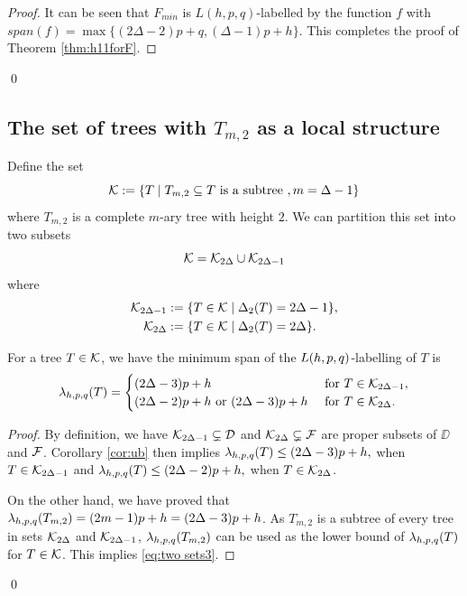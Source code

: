 \begin{proof}
It can be seen that $F_{min}$ is $L(h,p,q)$-labelled by the function $f$ with $span(f) = \max\{(2\Delta - 2)p+q, (\Delta-1)p+h\}$. This completes the proof of Theorem \ref{thm:h11forF}. 
\end{proof}
\qed






\subsection{The set of trees with $T_{m,2}$ as a local structure}
\label{subsection:tm2}

Define the set 
\[
{\cal K} :=\{ T \mid T_{m,2} \subseteq T \text{ is a subtree }, m = \Delta-1\}
\]
where $T_{m,2}$ is a complete $m$-ary tree with height $2$. We can partition this set into two subsets
\[
{\cal K} = {\cal K}_{2\Delta} \cup {\cal K}_{2\Delta-1}
\]
where
\begin{align*}
{\cal K}_{2\Delta-1} &:= \{ T \in {\cal K} \mid \Delta_2(T) = 2\Delta-1\}, \\
{\cal K}_{2\Delta} &:= \{T \in {\cal K} \mid \Delta_2(T) = 2\Delta\}. 
\end{align*}

\begin{corollary} 
For a tree $T \in {\cal K}$, we have the minimum span of the $L(h,p,q)$-labelling of $T$ is
\begin{align}
\label{eq:two sets3}
\lambda_{h,p,q}(T) = 
 \begin{cases}
 (2\Delta-3)p+h & \text{ for } T \in {\cal K}_{2\Delta-1}, \\
 (2\Delta-2)p+h \text{ or } (2\Delta-3)p+h & \text{ for } T\in {\cal K}_{2\Delta}. 
 \end{cases}
\end{align}
\end{corollary}

\begin{proof}
By definition, we have ${\cal K}_{2\Delta-1} \subsetneq {\cal D}$ and ${\cal K}_{2\Delta} \subsetneq {\cal F}$ are proper subsets of $\DD$ and ${\cal F}$. Corollary \ref{cor:ub} then implies $\lambda_{h,p,q}(T) \le (2\Delta-3)p+h,$ when $T\in {\cal K}_{2\Delta-1}$ and $\lambda_{h,p,q}(T) \le (2\Delta-2)p+h,$ when $T \in {\cal K}_{2\Delta}$. 

On the other hand, we have proved that $\lamhpq(\tm2) = (2m-1)p+h = (2\Delta-3)p+h$. As $T_{m,2}$ is a subtree of every tree in sets ${\cal K}_{2\Delta}$ and ${\cal K}_{2\Delta-1}$, $\lamhpq(\tm2)$ can be used as the lower bound of $\lambda_{h,p,q}(T)$ for $T \in {\cal K}$. This implies \eqref{eq:two sets3}. 
\end{proof}
\qed

